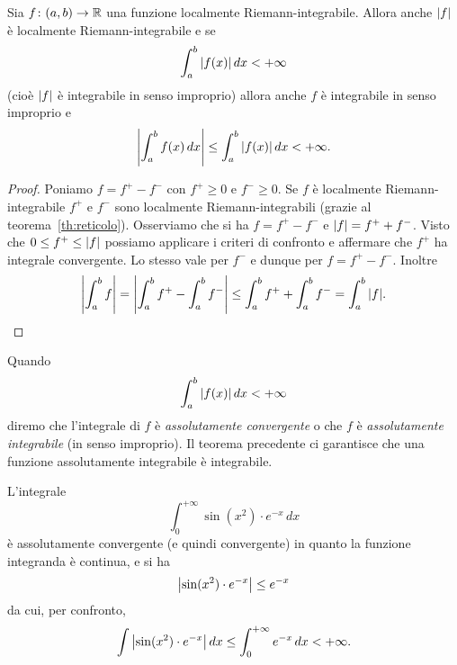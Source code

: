 \begin{theorem}
\label{th:convergenza_assoluta_integrale}
\mymark{**}%
Sia $f\colon (a,b)\to \mathbb R$ una funzione localmente Riemann-integrabile.
Allora anche ${\left|f\right|}$ è localmente Riemann-integrabile e se
\[
\int_a^b {\left|f(x)\right|}\, dx < +\infty
\]
(cioè ${\left|f\right|}$ è integrabile in senso improprio)
allora anche $f$ è integrabile in senso improprio e
\[
  {\left|\int_a^b f(x)\,dx\right|}
  \le \int_a^b {\left|f(x)\right|}\, dx < +\infty.
\]
\end{theorem}
%
%
\begin{proof}
Poniamo $f = f^+ - f^-$ con $f^+\ge 0$ e $f^-\ge 0$.
Se $f$ è localmente Riemann-integrabile
$f^+$ e $f^-$ sono localmente Riemann-integrabili
(grazie al teorema~\ref{th:reticolo}).
Osserviamo che si ha $f = f^+ - f^-$
e ${\left|f\right|} = f^+ + f^-$.
Visto che $0\le f^+ \le {\left|f\right|}$ possiamo
applicare i criteri di confronto e
affermare che $f^+$ ha integrale convergente.
Lo stesso vale per $f^-$ e dunque per $f=f^+ - f^-$.
Inoltre
\[
  {\left|\int_a^b f \right|}
  = {\left|\int_a^b f^+ - \int_a^b f^-\right|}
  \le \int_a^b f^+ + \int_a^b f^-
  = \int_a^b {\left|f\right|}.
\]
\end{proof}

\begin{definition}
%
%
%
%
%
Quando
\[
  \int_a^b {\left|f(x)\right|}\, dx <+\infty
\]
diremo che l'integrale di $f$ è \emph{assolutamente convergente}
o che $f$ è \emph{assolutamente integrabile} (in senso improprio).
Il teorema
precedente ci garantisce che una funzione assolutamente integrabile
è integrabile.
\end{definition}

\begin{example}
L'integrale
\[
  \int_0^{+\infty} \sin(x^2)\cdot e^{-x}\, dx
\]
è assolutamente convergente (e quindi convergente)
in quanto la funzione integranda è continua,
e si ha
\[
 {\left|\sin(x^2)\cdot e^{-x}\right|} \le e^{-x}
\]
da cui, per confronto,
\[
 \int {\left|\sin(x^2)\cdot e^{-x}\right|}\, dx  \le
  \int_0^{+\infty} e^{-x}\, dx < +\infty.
\]
\end{example}


